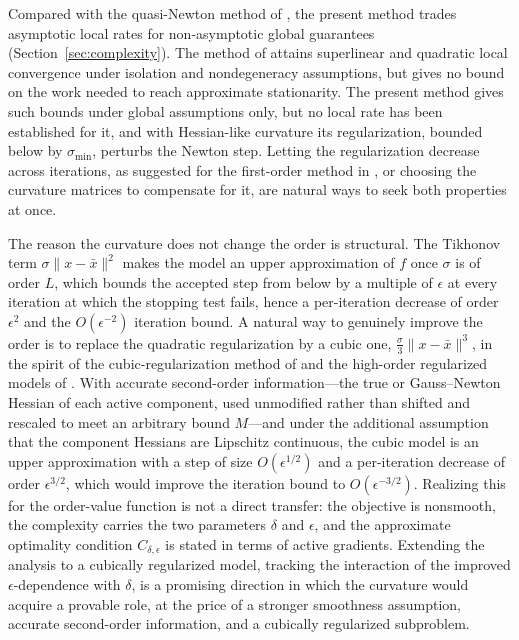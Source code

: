 \documentclass[11pt]{article}
\begin{document}
Compared with the quasi-Newton method of \cite{yano1}, the present method trades
asymptotic local rates for non-asymptotic global guarantees
(Section~\ref{sec:complexity}). The method of \cite{yano1} attains superlinear and
quadratic local convergence under isolation and nondegeneracy assumptions, but
gives no bound on the work needed to reach approximate stationarity. The
present method gives such bounds under global assumptions only, but no local
rate has been established for it, and with Hessian-like curvature its
regularization, bounded below by $\sigma_{\min}$, perturbs the Newton step.
Letting the regularization decrease across iterations, as suggested for the
first-order method in \cite{alvarezovo}, or choosing the curvature matrices to
compensate for it, are natural ways to seek both properties at once.

The reason the curvature does not change the order is structural. The Tikhonov
term $\sigma\|x - \bar x\|^2$ makes the model an upper approximation of $f$ once
$\sigma$ is of order $L$, which bounds the accepted step from below by a
multiple of $\epsilon$ at every iteration at which the stopping test fails,
hence a per-iteration decrease of order $\epsilon^2$ and the $O(\epsilon^{-2})$
iteration bound. A natural way to
genuinely improve the order is to replace the quadratic regularization by a
cubic one, $\tfrac{\sigma}{3}\|x - \bar x\|^3$, in the spirit of the
cubic-regularization method of \cite{nesterov} and the high-order regularized
models of \cite{bgmst1, bgms}. With accurate second-order information---the true
or Gauss--Newton Hessian of each active component, used unmodified rather than
shifted and rescaled to meet an arbitrary bound $M$---and under the additional
assumption that the component Hessians are
Lipschitz continuous, the cubic model is an upper approximation with a step of
size $O(\epsilon^{1/2})$ and a per-iteration decrease of order $\epsilon^{3/2}$,
which would improve the iteration bound to $O(\epsilon^{-3/2})$. Realizing this
for the order-value function is not a direct transfer: the objective is
nonsmooth, the complexity carries the two parameters $\delta$ and $\epsilon$, and
the approximate optimality condition $C_{\delta,\epsilon}$ is stated in terms of
active gradients. Extending the analysis to a cubically regularized model,
tracking the interaction of the improved $\epsilon$-dependence with $\delta$, is
a promising direction in which the curvature would acquire a provable role, at
the price of a stronger smoothness assumption, accurate second-order information,
and a cubically regularized subproblem.
\end{document}
